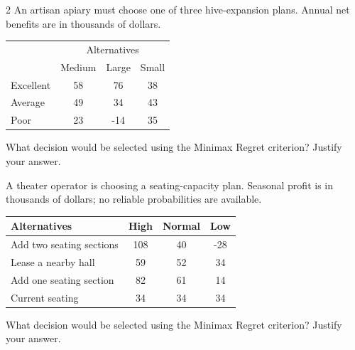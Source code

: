 \begin{multicols}{2}
		An artisan apiary must choose one of three hive-expansion plans. Annual net benefits are in thousands of dollars.\vspace{-3mm}
		\begin{center}
			\setlength{\tabcolsep}{3pt}
			\renewcommand{\arraystretch}{1.1}
			\begin{tabular}{lccc}
				\toprule
				& \multicolumn{3}{c}{Alternatives} \\
				& Medium & Large & Small \\ \midrule
				Excellent & 58 & 76 & 38 \\
				Average   & 49 & 34 & 43 \\
				Poor      & 23 & -14 & 35 \\ \bottomrule
			\end{tabular}
		\end{center}\vspace{-3mm}
		What decision would be selected using the Minimax Regret criterion? Justify your answer.

		A theater operator is choosing a seating-capacity plan. Seasonal profit is in thousands of dollars; no reliable probabilities are available.\vspace{-3mm}
		\begin{center}\setlength{\tabcolsep}{2pt}\renewcommand{\arraystretch}{1.1}
			\begin{tabular}{lccc}\toprule
			Alternatives & High & Normal & Low\\ \midrule
			Add two seating sections&108&40&-28\\
			Lease a nearby hall&59&52&34\\
			Add one seating section&82&61&14\\
			Current seating&34&34&34\\ \bottomrule
			\end{tabular}
		\end{center}\vspace{-3mm}
		What decision would be selected using the Minimax Regret criterion? Justify your answer.
		
		\columnbreak


\end{multicols}
